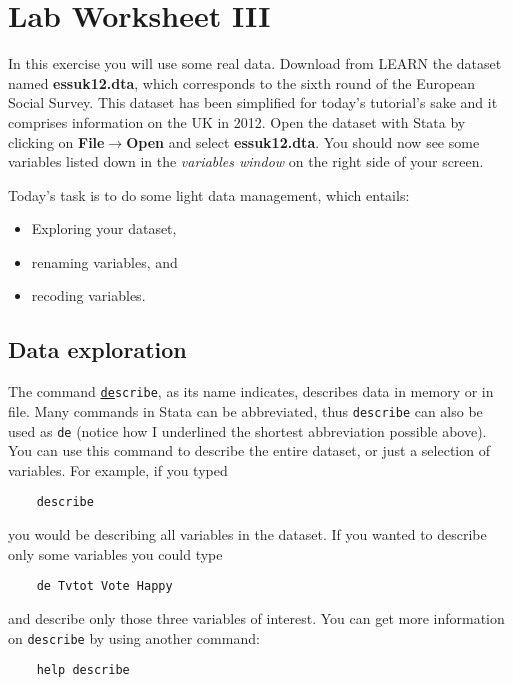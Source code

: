 \documentclass{article}
\begin{document}
\section*{\hfil Lab Worksheet III \hfil}	
In this exercise you will use some real data. Download from LEARN the dataset named \textbf{essuk12.dta}, which corresponds to the sixth round of the European Social Survey. This dataset has been simplified for today's tutorial's sake and it comprises information on the UK in 2012. Open the dataset with Stata by clicking on \textbf{File$\to$Open} and select \textbf{essuk12.dta}. You should now see some variables listed down in the \textit{variables window} on the right side of your screen.

Today's task is to do some light data management, which entails:

\begin{itemize}
	\item Exploring your dataset,
	\item renaming variables, and
	\item recoding variables.
\end{itemize}

\subsection*{Data exploration}
The command \texttt{\underline{de}scribe}, as its name indicates, describes data in memory or in file. Many commands in Stata can be abbreviated, thus \texttt{describe} can also be used as \texttt{de} (notice how I underlined the shortest abbreviation possible above). You can use this command to describe the entire dataset, or just a selection of variables. For example, if you typed

\begin{lstlisting}
	describe
\end{lstlisting}

you would be describing all variables in the dataset. If you wanted to describe only some variables you could type

\begin{lstlisting}
	de Tvtot Vote Happy
\end{lstlisting}

and describe only those three variables of interest. You can get more information on \texttt{describe} by using another command:

\begin{lstlisting}
	help describe
\end{lstlisting}
\end{document}
